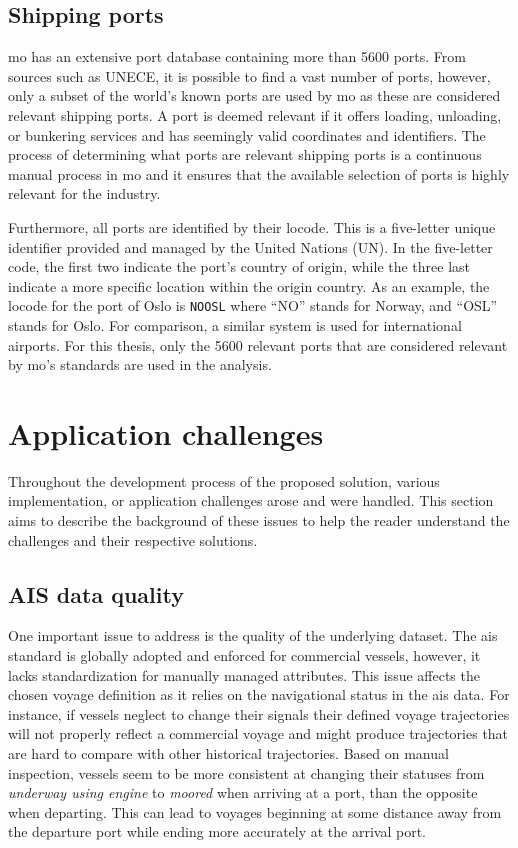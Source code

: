 \subsection{Shipping ports}
\label{sec:shipping_ports}

\acrshort{mo} has an extensive port database containing more than 5600 ports. From sources such as UNECE, it is possible to find a vast number of ports, however, only a subset of the world's known ports are used by \acrshort{mo} as these are considered relevant shipping ports. A port is deemed relevant if it offers loading, unloading, or bunkering services and has seemingly valid coordinates and identifiers. The process of determining what ports are relevant shipping ports is a continuous manual process in \acrshort{mo} and it ensures that the available selection of ports is highly relevant for the industry.

Furthermore, all ports are identified by their \gls{locode}. This is a five-letter unique identifier provided and managed by the United Nations (UN). In the five-letter code, the first two indicate the port's country of origin, while the three last indicate a more specific location within the origin country. As an example, the \gls{locode} for the port of Oslo is \texttt{NOOSL} where ``NO'' stands for Norway, and ``OSL'' stands for Oslo. For comparison, a similar system is used for international airports. For this thesis, only the 5600 relevant ports that are considered relevant by \acrshort{mo}'s standards are used in the analysis.

\section{Application challenges}

Throughout the development process of the proposed solution, various implementation, or application challenges arose and were handled. This section aims to describe the background of these issues to help the reader understand the challenges and their respective solutions.

\subsection{AIS data quality}

One important issue to address is the quality of the underlying dataset. The \acrshort{ais} standard is globally adopted and enforced for commercial vessels, however, it lacks standardization for manually managed attributes. This issue affects the chosen voyage definition as it relies on the navigational status in the \acrshort{ais} data. For instance, if vessels neglect to change their signals their defined voyage trajectories will not properly reflect a commercial voyage and might produce trajectories that are hard to compare with other historical trajectories. Based on manual inspection, vessels seem to be more consistent at changing their statuses from \textit{underway using engine} to \textit{moored} when arriving at a port, than the opposite when departing. This can lead to voyages beginning at some distance away from the departure port while ending more accurately at the arrival port.

